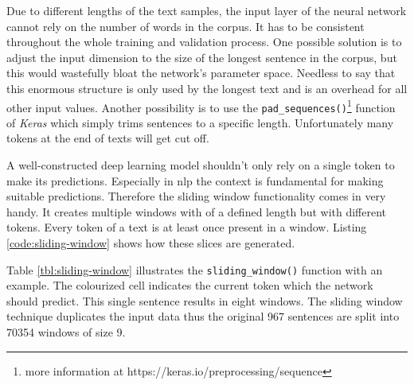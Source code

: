 Due to different lengths of the text samples, the input layer of the neural network cannot rely on the number of words in the corpus. It has to be consistent throughout the whole training and validation process. One possible solution is to adjust the input dimension to the size of the longest sentence in the corpus, but this would wastefully bloat the network's parameter space. Needless to say that this enormous structure is only used by the longest text and is an overhead for all other input values. Another possibility is to use the \verb|pad_sequences()|\footnote{more information at https://keras.io/preprocessing/sequence} function of \emph{Keras} which simply trims sentences to a specific length. Unfortunately many tokens at the end of texts will get cut off.

A well-constructed deep learning model shouldn't only rely on a single token to make its predictions. Especially in \acrshort{nlp} the context is fundamental for making suitable predictions. Therefore the sliding window functionality comes in very handy. It creates multiple windows with of a defined length but with different tokens. Every token of a text is at least once present in a window. Listing \ref{code:sliding-window} shows how these slices are generated.

Table \ref{tbl:sliding-window} illustrates the \verb|sliding_window()| function with an example. The colourized cell indicates the current token which the network should predict. This single sentence results in eight windows. The sliding window technique duplicates the input data thus the original 967 sentences are split into 70354 windows of size 9.

